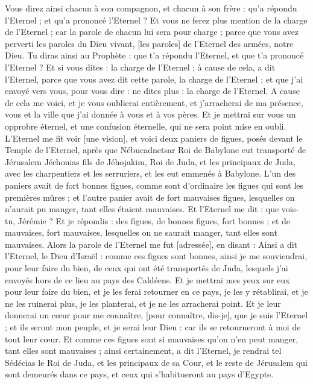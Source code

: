 \begin{multicols}{2}
Vous direz ainsi chacun à son compagnon, et chacun à son frère : qu'a répondu l'Eternel ; et qu'a prononcé l'Eternel ?
Et vous ne ferez plus mention de la charge de l'Eternel ; car la parole de chacun lui sera pour charge ; parce que vous avez perverti les paroles du Dieu vivant, [les paroles] de l'Eternel des armées, notre Dieu.
Tu diras ainsi au Prophète : que t'a répondu l'Eternel, et que t'a prononcé l'Eternel ?
Et si vous dites : la charge de l'Eternel ; à cause de cela, a dit l'Eternel, parce que vous avez dit cette parole, la charge de l'Eternel ; et que j'ai envoyé vers vous, pour vous dire : ne dites plus : la charge de l'Eternel.
A cause de cela me voici, et je vous oublierai entièrement, et j'arracherai de ma présence, vous et la ville que j'ai donnée à vous et à vos pères.
Et je mettrai sur vous un opprobre éternel, et une confusion éternelle, qui ne sera point mise en oubli.
\VerseOne{}L'Eternel me fit voir [une vision], et voici deux paniers de figues, posés devant le Temple de l'Eternel, après que Nébucadnetsar Roi de Babylone eut transporté de Jérusalem Jéchonias fils de Jéhojakim, Roi de Juda, et les principaux de Juda, avec les charpentiers et les serruriers, et les eut emmenés à Babylone.
L'un des paniers avait de fort bonnes figues, comme sont d'ordinaire les figues qui sont les premières mûres ; et l'autre panier avait de fort mauvaises figues, lesquelles on n'aurait pu manger, tant elles étaient mauvaises.
Et l'Eternel me dit : que vois-tu, Jérémie ? Et je répondis : des figues, de bonnes figues, fort bonnes ; et de mauvaises, fort mauvaises, lesquelles on ne saurait manger, tant elles sont mauvaises.
Alors la parole de l'Eternel me fut [adressée], en disant :
Ainsi a dit l'Eternel, le Dieu d'Israël : comme ces figues sont bonnes, ainsi je me souviendrai, pour leur faire du bien, de ceux qui ont été transportés de Juda, lesquels j'ai envoyés hors de ce lieu au pays des Caldéens.
Et je mettrai mes yeux sur eux pour leur faire du bien, et je les ferai retourner en ce pays, je les y rétablirai, et je ne les ruinerai plus, je les planterai, et je ne les arracherai point.
Et je leur donnerai un cœur pour me connaître, [pour connaître, dis-je], que je suis l'Eternel ; et ils seront mon peuple, et je serai leur Dieu : car ils se retourneront à moi de tout leur cœur.
Et comme ces figues sont si mauvaises qu'on n'en peut manger, tant elles sont mauvaises ; ainsi certainement, a dit l'Eternel, je rendrai tel Sédécias le Roi de Juda, et les principaux de sa Cour, et le reste de Jérusalem qui sont demeurés dans ce pays, et ceux qui s'habitueront au pays d'Egypte.

\end{multicols}
